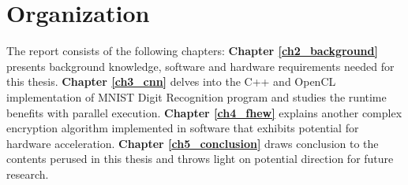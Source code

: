 \section{Organization}
\label{sect1_3}
The report consists of the following chapters: 
\textbf{Chapter \ref{ch2_background}} presents background knowledge, software and hardware requirements needed for this thesis. 
\textbf{Chapter \ref{ch3_cnn}} delves into the C++ and OpenCL implementation of MNIST Digit Recognition program and studies the runtime benefits with parallel execution.
\textbf{Chapter \ref{ch4_fhew}} explains another complex encryption algorithm implemented in software that exhibits potential for hardware acceleration.
\textbf{Chapter \ref{ch5_conclusion}} draws conclusion to the contents perused in this thesis and throws light on potential direction for future research.